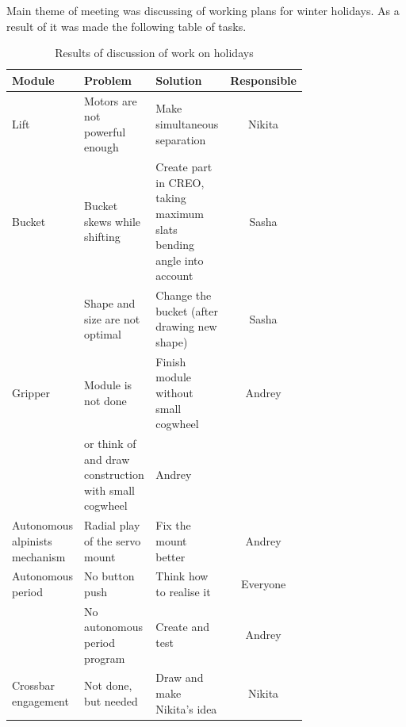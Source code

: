 Main theme of meeting was discussing of working plans for winter holidays. As a result of it was made the following table of tasks.
\begin{table}[H]
	\caption{Results of discussion of work on holidays}
	\label{tabular:meetingSPB10.01}
	\begin{center}
		\begin{tabular}{|p{0.12\linewidth}|p{0.3\linewidth}|p{0.32\linewidth}|c|}
		  \hline 
		  Module & Problem & Solution & Responsible \\
		  \hline 
		  Lift	& Motors are not powerful enough & Make simultaneous separation &	Nikita \\
		  \hline
		  Bucket & Bucket skews while shifting & Create part in CREO, taking maximum slats bending angle into account & Sasha \\
		   & Shape and size are not optimal & Change the bucket (after drawing new shape) &	Sasha \\
		  \hline
		  Gripper	& Module is not done & Finish module without small cogwheel	& Andrey \\
		  & or think of and draw construction with small cogwheel	& Andrey & \\
		  \hline
		  Autonomous alpinists mechanism & Radial play of the servo mount & Fix the mount better & Andrey \\
		  \hline
		  Autonomous period & No button push & Think how to realise it & Everyone\\
		  & No autonomous period program	& Create and test & Andrey\\	
		  \hline
		  Crossbar engagement & Not done, but needed & Draw and make Nikita's idea & Nikita \\
		  \hline
		\end{tabular}
	\end{center}
\end{table}
